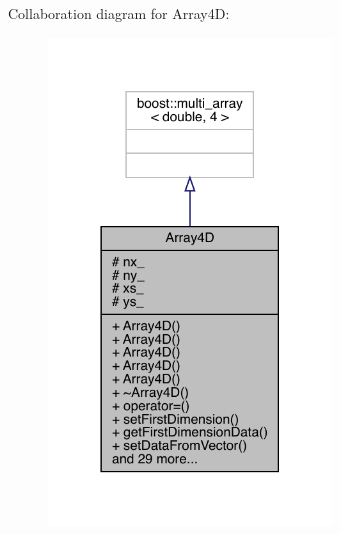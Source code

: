 Collaboration diagram for Array4D\+:\nopagebreak
\begin{figure}[H]
\begin{center}
\leavevmode
\includegraphics[width=213pt]{class_array4_d__coll__graph}
\end{center}
\end{figure}

